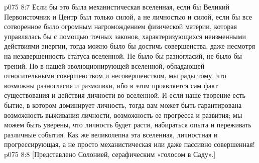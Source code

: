 \vs p075 8:7 Если бы это была механистическая вселенная, если бы Великий Первоисточник и Центр был только силой, а не личностью и силой, если бы все сотворенное было огромным нагромождением физической материи, которая управлялась бы с помощью точных законов, характеризующихся неизменными действиями энергии, тогда можно было бы достичь совершенства, даже несмотря на незавершенность статуса вселенной. Не было бы разногласий, не было бы трений. Но в нашей эволюционирующей вселенной, обладающей относительными совершенством и несовершенством, мы рады тому, что возможны разногласия и размолвки, ибо в этом проявляется сам факт существования и действия личности во вселенной. И если наше творение есть бытие, в котором доминирует личность, тогда вам может быть гарантирована возможность выживания личности, возможность ее прогресса и развития; мы можем быть уверены, что личность будет расти, набираться опыта и переживать различные события. Как же великолепна эта вселенная, личностная и прогрессирующая, а не просто механистическая или даже пассивно совершенная!
\vsetoff
\vs p075 8:8 [Представлено Солонией, серафическим «голосом в Саду».]
